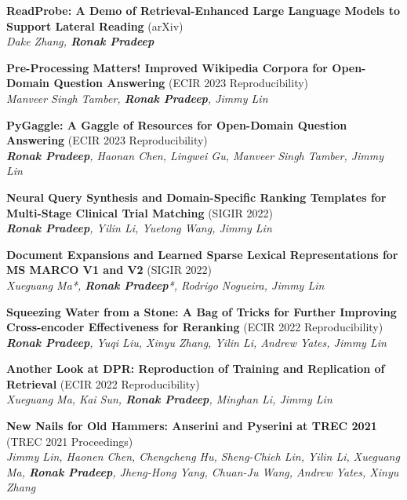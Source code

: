 \documentclass[letterpaper,12pt]{article}
\newcommand{\resumeItem}[0]{
  \item\small{ \vspace{-2pt}
  }
}
\begin{document}
\resumeItem{\textbf{ReadProbe: A Demo of Retrieval-Enhanced Large Language Models to Support Lateral Reading} (arXiv)}\\
\textit{Dake Zhang, \textbf{Ronak Pradeep}}

  \resumeItem{\textbf{Pre-Processing Matters! Improved Wikipedia Corpora for Open-Domain Question Answering} (ECIR 2023 Reproducibility)}\\
    \textit{Manveer Singh Tamber, \textbf{Ronak Pradeep}, Jimmy Lin}\\
  \resumeItem{\textbf{PyGaggle: A Gaggle of Resources for Open-Domain Question Answering} (ECIR 2023 Reproducibility)}\\
    \textit{\textbf{Ronak Pradeep}, Haonan Chen, Lingwei Gu, Manveer Singh Tamber, Jimmy Lin}\\
  \resumeItem{\textbf{Neural Query Synthesis and Domain-Specific Ranking Templates for Multi-Stage Clinical Trial Matching} (SIGIR 2022)}\\
    \textit{\textbf{Ronak Pradeep}, Yilin Li, Yuetong Wang, Jimmy Lin}\\
    \resumeItem{\textbf{Document Expansions and Learned Sparse Lexical Representations for MS MARCO V1 and V2} (SIGIR 2022)}\\
    \textit{Xueguang Ma*, \textbf{Ronak Pradeep}*, Rodrigo Nogueira, Jimmy Lin}\\
  \resumeItem{\textbf{Squeezing Water from a Stone: A Bag of Tricks for Further Improving Cross-encoder Effectiveness for Reranking} (ECIR 2022 Reproducibility)}\\
    \textit{\textbf{Ronak Pradeep}, 
              Yuqi Liu, 
              Xinyu Zhang, 
              Yilin Li, 
              Andrew Yates,
              Jimmy Lin}\\
   \resumeItem{\textbf{Another Look at DPR: Reproduction of Training and Replication of Retrieval} (ECIR 2022 Reproducibility)}\\
    \textit{Xueguang Ma,
              Kai Sun,
              \textbf{Ronak Pradeep}, 
              Minghan Li,
              Jimmy Lin}\\
    \resumeItem{\textbf{New Nails for Old Hammers: Anserini and Pyserini at TREC 2021} (TREC 2021 Proceedings)}\\
    \textit{Jimmy Lin,
              Haonen Chen,
              Chengcheng Hu,
              Sheng-Chieh Lin,
              Yilin Li,
              Xueguang Ma,
          \textbf{Ronak Pradeep}, 
              Jheng-Hong Yang,
              Chuan-Ju Wang,
              Andrew Yates,
              Xinyu Zhang}\\
\end{document}
